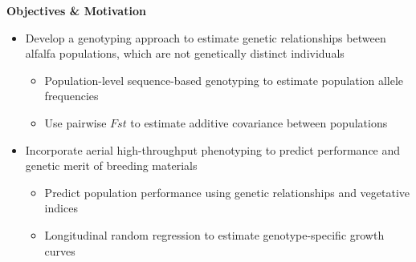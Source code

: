 \documentclass[10pt, letterpaper]{article}
\begin{document}
\begin{minipage}{0.5\linewidth}%
\large{\textbf{Objectives \& Motivation}}
\raggedright{
\noindent \begin{itemize}
	\item Develop a genotyping approach to estimate genetic relationships between alfalfa populations, which are not genetically distinct individuals
	\begin{itemize}
		\item Population-level sequence-based genotyping to estimate population allele frequencies
		\item Use pairwise $F{st}$ to estimate additive covariance between populations
	\end{itemize}
	\item Incorporate aerial high-throughput phenotyping to predict performance and genetic merit of breeding materials
	\begin{itemize}
		\item Predict population performance using genetic relationships and vegetative indices
		\item Longitudinal random regression to estimate genotype-specific growth curves
	\end{itemize}

\end{itemize}
}
\end{minipage}%
\begin{minipage}{0.05\linewidth}
\
\end{minipage}%
\end{document}
